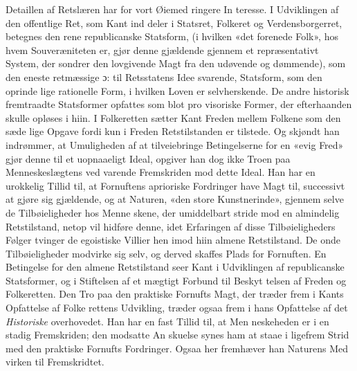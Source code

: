 \documentclass[12pt,a4paper]{book}
\begin{document}
Detaillen af Retslæren har for vort Øiemed ringere In\-%
teresse. I Udviklingen af den offentlige Ret, som Kant ind\-%
deler i Statsret, Folkeret og Verdensborgerret, betegnes den
rene republicanske Statsform, (i hvilken «det forenede Folk»,
hos hvem Souveræniteten er, gjør denne gjældende gjennem et
repræsentativt System, der sondrer den lovgivende Magt fra
den udøvende og dømmende), som den eneste retmæssige
ɔ: til Retsstatens Idee svarende, Statsform, som den oprinde\-%
lige rationelle Form, i hvilken Loven er selvherskende. De
andre historisk fremtraadte Statsformer opfattes som blot pro\-%
visoriske Former, der efterhaanden skulle opløses i hiin. I
Folkeretten sætter Kant Freden mellem Folkene som den sæde\-%
lige Opgave fordi kun i Freden Retstilstanden er tilstede. Og
skjøndt han indrømmer, at Umuligheden af at tilveiebringe
Betingelserne for en «evig Fred» gjør denne til et uopnaaeligt
Ideal, opgiver han dog ikke Troen paa Menneskeslægtens ved\-%
varende Fremskriden mod dette Ideal. Han har en urokkelig
Tillid til, at Fornuftens aprioriske Fordringer have Magt til,
successivt at gjøre sig gjældende, og at Naturen, «den store
Kunstnerinde», gjennem selve de Tilbøieligheder hos Menne\-%
skene, der umiddelbart stride mod en almindelig Retstilstand,
netop vil hidføre denne, idet Erfaringen af disse Tilbøieligheders
Følger tvinger de egoistiske Villier hen imod hiin almene
Retstilstand. De onde Tilbøieligheder modvirke sig selv, og
derved skaffes Plads for Fornuften. En Betingelse for den
almene Retstilstand seer Kant i Udviklingen af republicanske
Statsformer, og i Stiftelsen af et mægtigt Forbund til Beskyt\-%
telsen af Freden og Folkeretten. Den Tro paa den praktiske
Fornufts Magt, der træder frem i Kants Opfattelse af Folke\-%
rettens Udvikling, træder ogsaa frem i hans Opfattelse af det
\emph{Historiske} overhovedet. Han har en fast Tillid til, at Men\-%
neskeheden er i en stadig Fremskriden; den modsatte An\-%
skuelse synes ham at staae i ligefrem Strid med den praktiske
Fornufts Fordringer. Ogsaa her fremhæver han Naturens Med\-%
virken til Fremskridtet.
\end{document}
